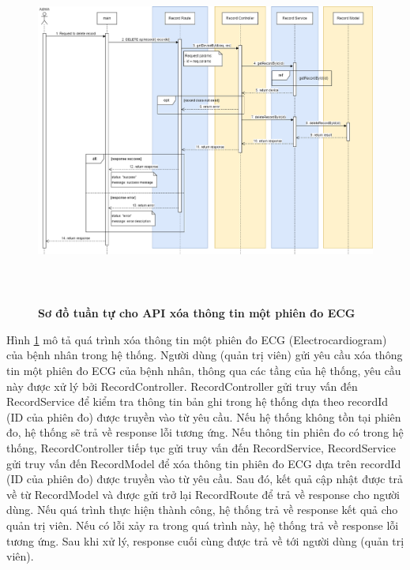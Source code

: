  \begin{figure}[H]
  \centering
  \includegraphics[width=16cm,height=11.5cm]{Images/sequence_api/deleteRecordById.png}
  \caption[Sơ đồ tuần tự cho API xóa thông tin một phiên đo ECG ]{\bfseries \fontsize{12pt}{0pt}
  \selectfont Sơ đồ tuần tự cho API xóa thông tin một phiên đo ECG }
  \label{api_deleteRecordById} %
\end{figure}
Hình \ref{api_deleteRecordById} mô tả quá trình xóa thông tin một phiên đo ECG (Electrocardiogram) của bệnh nhân trong hệ thống. Người dùng (quản trị viên) gửi yêu cầu xóa thông tin một phiên đo ECG của bệnh nhân, thông qua các tầng của hệ thống, 
yêu cầu này được xử lý bởi RecordController. RecordController gửi truy vấn đến RecordService để kiểm tra thông tin bản ghi trong hệ thống dựa theo recordId (ID của phiên đo) được truyền vào từ yêu cầu. Nếu hệ thống không tồn tại phiên đo, hệ thống sẽ trả về response lỗi tương ứng. 
Nếu thông tin phiên đo có trong hệ thống, RecordController tiếp tục gửi truy vấn đến RecordService, RecordService gửi truy vấn đến RecordModel để xóa thông tin phiên đo ECG dựa trên recordId (ID của phiên đo) được truyền vào từ yêu cầu. Sau đó, kết quả cập nhật được trả về từ RecordModel 
và được gửi trở lại RecordRoute để trả về response cho người dùng. Nếu quá trình thực hiện thành công, hệ thống trả về response kết quả cho quản trị viên. Nếu có lỗi xảy ra  trong quá trình này, hệ thống trả về response lỗi tương ứng. Sau khi xử lý, response cuối cùng được trả về tới người dùng (quản trị viên).


